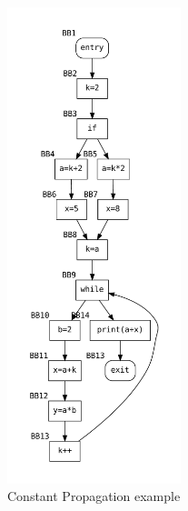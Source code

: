 \documentclass{article}
\begin{document}
\begin{figure}[H]
	\centering
	\includegraphics[width=0.45\textwidth]{graphs/constant_propagation.pdf}
	\caption{Constant Propagation example}
	\label{fig:enter-label}
\end{figure}
\end{document}
